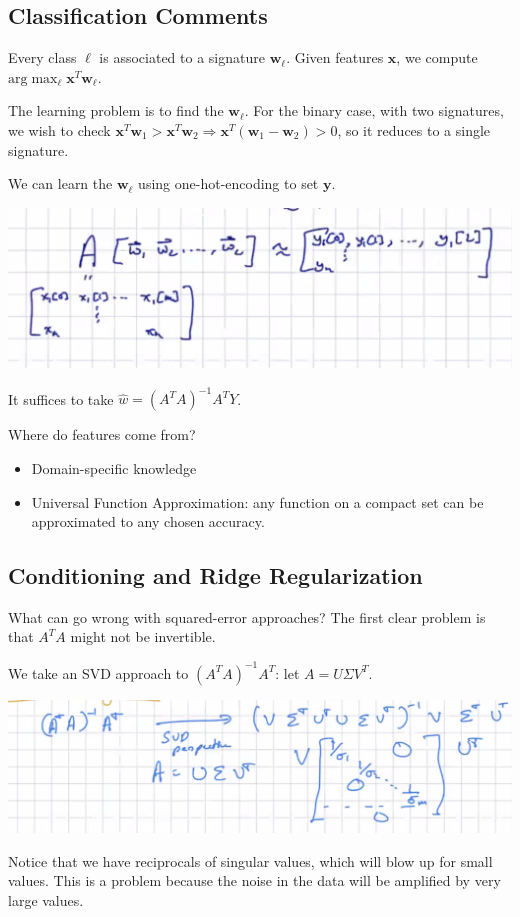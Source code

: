 \documentclass[11pt]{scrartcl}
\newcommand{\Vw}{\mathbf{w}}
\newcommand{\Vx}{\mathbf{x}}
\newcommand{\Vy}{\mathbf{y}}
\begin{document}
\subsection{Classification Comments}
\begin{definition} Every class $\ell$ is associated to a signature $\Vw_\ell$.  Given features $\Vx$, we compute $\text{arg}\max_{\ell} \Vx^T \Vw_\ell$.
\end{definition}
The learning problem is to find the $\Vw_\ell$.  For the binary case, with two signatures, we wish to check $\Vx^T \Vw_1 > \Vx^T\Vw_2\Rightarrow \Vx^T(\Vw_1 - \Vw_2) > 0$, so it reduces to a single signature.

We can learn the $\Vw_\ell$ using one-hot-encoding to set $\Vy$.  
\begin{center}
\includegraphics[scale = 0.5]{matrixMultiply.png}
\end{center}
It suffices to take $\hat{w} = (A^TA)^{-1}A^TY$.


Where do features come from?
\begin{itemize}
\item Domain-specific knowledge
\item Universal Function Approximation: any function on a compact set can be approximated to any chosen accuracy.
\end{itemize}
\subsection{Conditioning and Ridge Regularization}
What can go wrong with squared-error approaches?  The first clear problem is that $A^TA$ might not be invertible.

We take an SVD approach to $(A^TA)^{-1}A^T$: let $A = U\Sigma V^T$.
\begin{center}
\includegraphics[scale=0.5]{svd.png}
\end{center}
Notice that we have reciprocals of singular values, which will blow up for small values.  This is a problem because the noise in the data will be amplified by very large values. 
\end{document}
